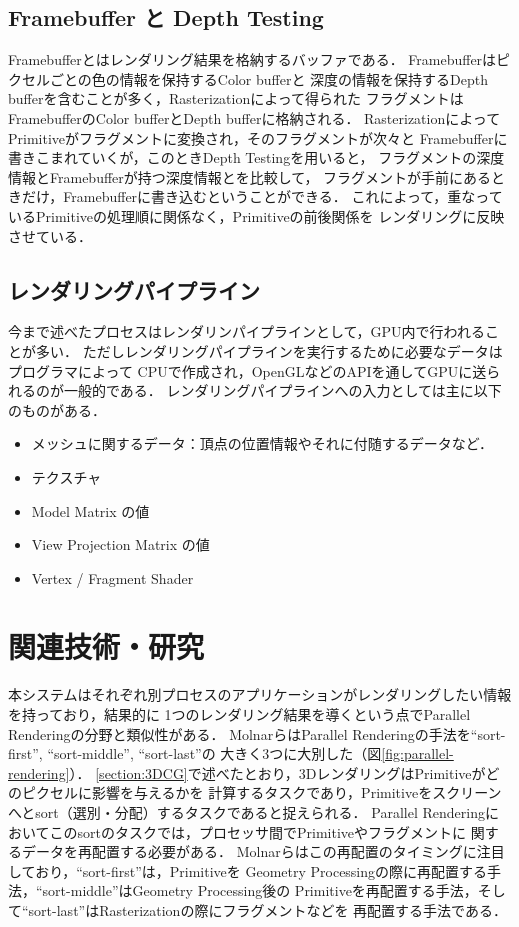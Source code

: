 \subsection*{Framebuffer と Depth Testing}

Framebufferとはレンダリング結果を格納するバッファである．
Framebufferはピクセルごとの色の情報を保持するColor bufferと
深度の情報を保持するDepth bufferを含むことが多く，Rasterizationによって得られた
フラグメントはFramebufferのColor bufferとDepth bufferに格納される．
RasterizationによってPrimitiveがフラグメントに変換され，そのフラグメントが次々と
Framebufferに書きこまれていくが，このときDepth Testingを用いると，
フラグメントの深度情報とFramebufferが持つ深度情報とを比較して，
フラグメントが手前にあるときだけ，Framebufferに書き込むということができる．
これによって，重なっているPrimitiveの処理順に関係なく，Primitiveの前後関係を
レンダリングに反映させている．

\subsection*{レンダリングパイプライン}

今まで述べたプロセスはレンダリンパイプラインとして，GPU内で行われることが多い．
ただしレンダリングパイプラインを実行するために必要なデータはプログラマによって
CPUで作成され，OpenGLなどのAPIを通してGPUに送られるのが一般的である．
レンダリングパイプラインへの入力としては主に以下のものがある．

\begin{itemize}
  \item メッシュに関するデータ：頂点の位置情報やそれに付随するデータなど．
  \item テクスチャ
  \item Model Matrix の値
  \item View Projection Matrix の値
  \item Vertex / Fragment Shader
\end{itemize}

\section{関連技術・研究}

本システムはそれぞれ別プロセスのアプリケーションがレンダリングしたい情報を持っており，結果的に
1つのレンダリング結果を導くという点でParallel Renderingの分野と類似性がある．
MolnarらはParallel Renderingの手法を``sort-first'', ``sort-middle'', ``sort-last''の
大きく3つに大別した\cite{parallel-rendering}（図\ref{fig:parallel-rendering}）．
\ref{section:3DCG}で述べたとおり，3DレンダリングはPrimitiveがどのピクセルに影響を与えるかを
計算するタスクであり，Primitiveをスクリーンへとsort（選別・分配）するタスクであると捉えられる．
Parallel Renderingにおいてこのsortのタスクでは，プロセッサ間でPrimitiveやフラグメントに
関するデータを再配置する必要がある．
Molnarらはこの再配置のタイミングに注目しており，``sort-first''は，Primitiveを
Geometry Processingの際に再配置する手法，``sort-middle''はGeometry Processing後の
Primitiveを再配置する手法，そして``sort-last''はRasterizationの際にフラグメントなどを
再配置する手法である．

